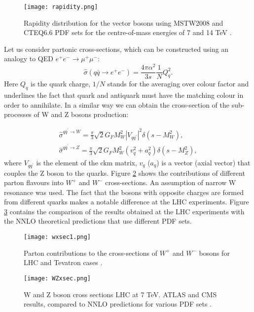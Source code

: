 		\begin{figure}[htbp]
			\centering
			\texttt{[image: rapidity.png]}
			\caption{ Rapidity distribution for the vector bosons using MSTW2008 and CTEQ6.6 PDF sets for the centre-of-mass energies of 7 and 14 TeV \cite{Halzen:2013bqa}.}
			\label{fig::Wrapidity}
		\end{figure}
		Let us consider partonic cross-sections, which can be constructed using an analogy to QED $e^{+}e^{-}\rightarrow \mu^{+}\mu^{-}$:
		\begin{equation}
			\hat{\sigma}(q\bar q \rightarrow e^{+}e^{-}) = \frac{4\pi \alpha^2}{3s}\frac{1}{N}Q^2_q.
		\end{equation}	
		Here $Q_q$ is the quark charge, $1/N$ stands for the averaging over colour factor and underlines the fact that quark and antiquark must have the matching colour in order to annihilate. In a similar way we can obtain the cross-section of the sub-processes of W and Z bosons production:

		\begin{equation}
		\begin{array}{lcl} 
		\hat{\sigma}^{q\bar q^\prime \rightarrow W}= \frac{\pi }{3}\sqrt{2}G_FM^2_W|V_{qq^\prime}|^2\delta(s-M^2_W),\\
		\hat{\sigma}^{q\bar q^\prime \rightarrow Z}= \frac{\pi }{3}\sqrt{2}G_FM^2_W(v^2_q+a^2_q)\delta(s-M^2_Z),
		\end{array}
		\end{equation}	
		where $V_{qq^\prime}$ is the element of the \gls{ckm} matrix,  $v_q$ ($a_q$) is a vector (axial vector) that couples the Z boson to the quarks. Figure \ref{fig::wxsec} shows the contributions of different parton flavours into $W^+$ and $W^-$ cross-sections. An assumption of narrow W resonance was used. The fact that the bosons with opposite charges are formed from different quarks makes a notable difference at the LHC experiments. Figure \ref{fig::wzxsec} contains the comparison of the results obtained at the LHC experiments with the NNLO theoretical predictions that use different PDF sets.
		\begin{figure}[htbp]
			\centering
			\texttt{[image: wxsec1.png]}
			\caption{Parton contributions to the cross-sections of $W^+$ and $W^-$ bosons for LHC and Tevatron cases \cite{Martin:392675}.}
			\label{fig::wxsec}
		\end{figure}
		\begin{figure}[htbp]
		\texttt{[image: WZxsec.png]}
		\caption{W and Z boson cross sections LHC at 7 TeV. ATLAS and CMS results, compared to NNLO predictions for various PDF sets \cite{Mangano:2015ejw}.}
		\label{fig::wzxsec}
		\end{figure}

